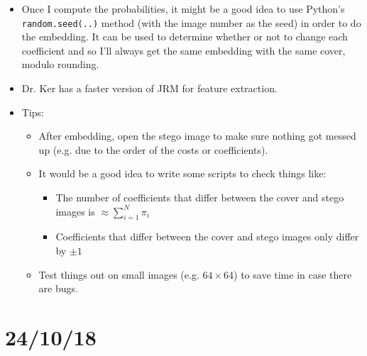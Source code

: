 \documentclass[11pt,a4paper]{report}
\begin{document}
\begin{itemize}
\item Once I compute the probabilities, it might be a good idea to use Python's \texttt{random.seed(..)} method (with the image number as the seed) in order to do the embedding. It can be used to determine whether or not to change each coefficient and so I'll always get the same embedding with the same cover, modulo rounding.

\item Dr. Ker has a faster version of JRM for feature extraction.

\item Tips:
  \begin{itemize}
  \item After embedding, open the stego image to make sure nothing got messed up (e.g. due to the order of the costs or coefficients).

  \item It would be a good idea to write some scripts to check things like:
    \begin{itemize}
    \item The number of coefficients that differ between the cover and stego images is $\approx \sum\limits_{i=1}^N \pi_i$
    \item Coefficients that differ between the cover and stego images only differ by $\pm1$
    \end{itemize}

  \item Test things out on small images (e.g. $64\times64$) to save time in case there are bugs.
  \end{itemize}

\end{itemize}


\section{24/10/18}
\end{document}
